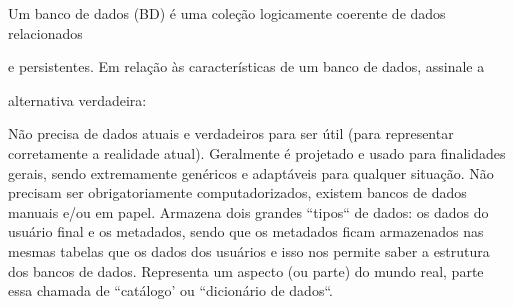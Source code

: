 \documentclass[12pt, addpoints]{exam}
\begin{document}
\begin{questions}
\begin{choices}
\end{choices}

\question

Um banco de dados (BD) é uma coleção logicamente coerente de dados relacionados

e persistentes. Em relação às características de um banco de dados, assinale a

alternativa verdadeira:
\begin{choices}
\choice Não precisa de dados atuais e verdadeiros para ser útil (para representar corretamente a realidade atual).
\choice Geralmente é projetado e usado para finalidades gerais, sendo extremamente genéricos e adaptáveis para qualquer situação.
\choice Não precisam ser obrigatoriamente computadorizados, existem bancos de dados manuais e/ou em papel.
\choice Armazena dois grandes ``tipos`` de dados: os dados do usuário final e os metadados, sendo que os metadados ficam armazenados nas mesmas tabelas que os dados dos usuários e isso nos permite saber a estrutura dos bancos de dados.
\choice Representa um aspecto (ou parte) do mundo real, parte essa chamada de ``catálogo' ou ``dicionário de dados``.
\end{choices}



    \end{questions}
    
\end{document}
